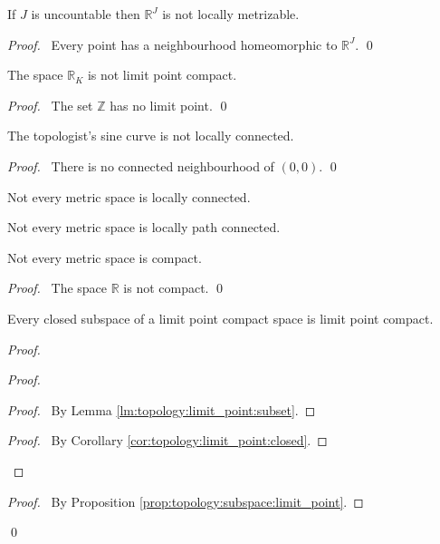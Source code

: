 \begin{prop}
If $J$ is uncountable then $\mathbb{R}^J$ is not locally metrizable.
\end{prop}

\begin{proof}
\pf\ Every point has a neighbourhood homeomorphic to $\mathbb{R}^J$. \qed
\end{proof}

\begin{prop}
The space $\mathbb{R}_K$ is not limit point compact.
\end{prop}

\begin{proof}
\pf\ The set $\mathbb{Z}$ has no limit point. \qed
\end{proof}

\begin{prop}
The topologist's sine curve is not locally connected.
\end{prop}

\begin{proof}
\pf\ There is no connected neighbourhood of $(0,0)$. \qed
\end{proof}

\begin{cor}
Not every metric space is locally connected.
\end{cor}

\begin{cor}
Not every metric space is locally path connected.
\end{cor}

\begin{prop}
Not every metric space is compact.
\end{prop}

\begin{proof}
\pf\ The space $\mathbb{R}$ is not compact. \qed
\end{proof}

\begin{prop}
Every closed subspace of a limit point compact space is limit point compact.
\end{prop}

\begin{proof}
\pf
{}
\begin{proof}
  \begin{proof}
    \pf\ By Lemma \ref{lm:topology:limit_point:subset}.
  \end{proof}
  \qedstep
  \begin{proof}
    \pf\ By Corollary \ref{cor:topology:limit_point:closed}.
  \end{proof}
\end{proof}
\begin{proof}
  \pf\ By Proposition \ref{prop:topology:subspace:limit_point}.
\end{proof}
\qed
\end{proof}

